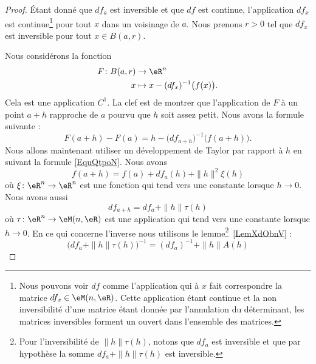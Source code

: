 \begin{proof}
    Étant donné que \( df_a\) est inversible et que \( df\) est continue, l'application \( df_x\) est continue\footnote{Nous pouvons voir \( df\) comme l'application qui à \( x\) fait correspondre la matrice \( df_x\in\eM(n,\eR)\). Cette application étant continue et la non inversibilité d'une matrice étant donnée par l'annulation du déterminant, les matrices inversibles forment un ouvert dans l'ensemble des matrices.} pour tout \( x\) dans un voisinage de \( a\). Nous prenons \( r>0\) tel que \( df_x\) est inversible pour tout \( x\in B(a,r)\).

    Nous considérons la fonction
    \begin{equation}
        \begin{aligned}
                F\colon B(a,r)&\to \eR^n \\
                x&\mapsto x-(df_x)^{-1}\big( f(x) \big).
            \end{aligned}
        \end{equation}
        Cela est une application \( C^1\). La clef est de montrer que l'application de \( F\) à un point \( a+h\) rapproche de \( a\) pourvu que \( h\) soit assez petit. Nous avons la formule suivante :
        \begin{equation}        \label{EqyDLQeE}
            F(a+h)-F(a)=h-\big( df_{a+h} \big)^{-1}\big( f(a+h) \big).
        \end{equation}
        Nous allons maintenant utiliser un développement de Taylor par rapport à \( h\) en suivant la formule \eqref{EquQtpoN}. Nous avons
        \begin{equation}
            f(a+h)=f(a)+df_a(h)+\| h \|^2\xi(h)
        \end{equation}
        où \( \xi\colon \eR^n\to \eR^n\) est une fonction qui tend vers une constante lorsque \( h\to 0\). Nous avons aussi
        \begin{equation}
            df_{a+h}=df_a+\| h \|\tau(h)
        \end{equation}
        où \( \tau\colon \eR^n\to \eM(n,\eR)\) est une application qui tend vers une constante lorsque \( h\to 0\). En ce qui concerne l'inverse nous utilisons le lemme\footnote{Pour l'inversibilité de \( \| h \|\tau(h)\), notons que \( df_a\) est inversible et que par hypothèse la somme \( df_a+\| h \|\tau(h)\) est inversible.}~\ref{LemXdObnV} :
        \begin{equation}
            \big( df_a+\| h \|\tau(h) \big)^{-1}=(df_a)^{-1}+\| h \|A(h)
        \end{equation}

\end{proof}
